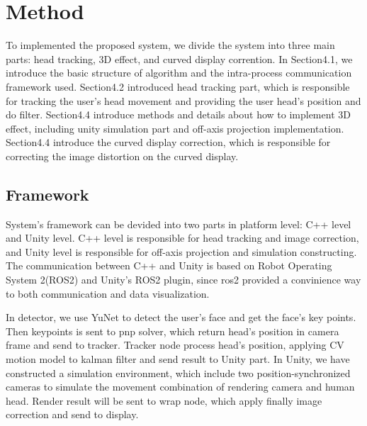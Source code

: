 
\section{Method}

To implemented the proposed system, we divide the system into three main parts: head tracking, 3D effect, and curved display corrention. In Section4.1, we introduce the basic structure of algorithm and the intra-process communication framework used. Section4.2 introduced head tracking part, which is responsible for tracking the user's head movement and providing the user head's position and do filter. Section4.4 introduce methods and details about how to implement 3D effect, including unity simulation part and off-axis projection implementation. Section4.4 introduce the curved display correction, which is responsible for correcting the image distortion on the curved display.

\subsection{Framework}
System's framework can be devided into two parts in platform level: C++ level and Unity level. C++ level is responsible for head tracking and image correction, and Unity level is responsible for off-axis projection and simulation constructing. The communication between C++ and Unity is based on Robot Operating System 2(ROS2)\cite{ros2} and Unity's ROS2 plugin\cite{ros2forunity}, since ros2 provided a convinience way to both communication and data visualization.


In detector, we use YuNet\cite{Wu_2023} to detect the user's face and get the face's key points. Then keypoints is sent to pnp solver, which return head's position in camera frame and send to tracker. Tracker node process head's position, applying CV motion model to kalman filter and send result to Unity part. In Unity, we have constructed a simulation environment, which include two position-synchronized cameras to simulate the movement combination of rendering camera and human head. Render result will be sent to wrap node, which apply finally image correction and send to display.

